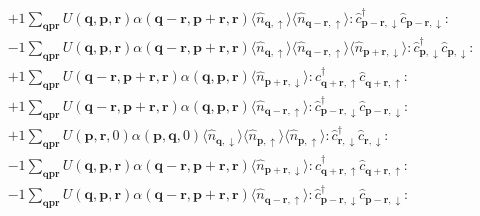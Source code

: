 \begin{align*}
	&+1 \sum_{ \mathbf{q} \mathbf{p} \mathbf{r} } U( \mathbf{q}, \mathbf{p}, \mathbf{r} )  \alpha( \mathbf{q}-\mathbf{r}, \mathbf{p}+\mathbf{r}, \mathbf{r} )   \langle \hat{n}_{ \mathbf{q}, \uparrow } \rangle \langle \hat{n}_{ \mathbf{q}-\mathbf{r}, \uparrow } \rangle :\hat{c}_{ \mathbf{p}-\mathbf{r}, \downarrow }^\dagger \hat{c}_{ \mathbf{p}-\mathbf{r}, \downarrow }^{\phantom{\dagger}}: \\
	&-1 \sum_{ \mathbf{q} \mathbf{p} \mathbf{r} } U( \mathbf{q}, \mathbf{p}, \mathbf{r} )  \alpha( \mathbf{q}-\mathbf{r}, \mathbf{p}+\mathbf{r}, \mathbf{r} )   \langle \hat{n}_{ \mathbf{q}, \uparrow } \rangle \langle \hat{n}_{ \mathbf{q}-\mathbf{r}, \uparrow } \rangle \langle \hat{n}_{ \mathbf{p}+\mathbf{r}, \downarrow } \rangle :\hat{c}_{ \mathbf{p}, \downarrow }^\dagger \hat{c}_{ \mathbf{p}, \downarrow }^{\phantom{\dagger}}: \\
	&+1 \sum_{ \mathbf{q} \mathbf{p} \mathbf{r} } U( \mathbf{q}-\mathbf{r}, \mathbf{p}+\mathbf{r}, \mathbf{r} )  \alpha( \mathbf{q}, \mathbf{p}, \mathbf{r} )   \langle \hat{n}_{ \mathbf{p}+\mathbf{r}, \downarrow } \rangle :\hat{c}_{ \mathbf{q}+\mathbf{r}, \uparrow }^\dagger \hat{c}_{ \mathbf{q}+\mathbf{r}, \uparrow }^{\phantom{\dagger}}: \\
	&+1 \sum_{ \mathbf{q} \mathbf{p} \mathbf{r} } U( \mathbf{q}-\mathbf{r}, \mathbf{p}+\mathbf{r}, \mathbf{r} )  \alpha( \mathbf{q}, \mathbf{p}, \mathbf{r} )   \langle \hat{n}_{ \mathbf{q}-\mathbf{r}, \uparrow } \rangle :\hat{c}_{ \mathbf{p}-\mathbf{r}, \downarrow }^\dagger \hat{c}_{ \mathbf{p}-\mathbf{r}, \downarrow }^{\phantom{\dagger}}: \\
	&+1 \sum_{ \mathbf{q} \mathbf{p} \mathbf{r} } U( \mathbf{p}, \mathbf{r}, 0 )  \alpha( \mathbf{p}, \mathbf{q}, 0 )   \langle \hat{n}_{ \mathbf{q}, \downarrow } \rangle \langle \hat{n}_{ \mathbf{p}, \uparrow } \rangle \langle \hat{n}_{ \mathbf{p}, \uparrow } \rangle :\hat{c}_{ \mathbf{r}, \downarrow }^\dagger \hat{c}_{ \mathbf{r}, \downarrow }^{\phantom{\dagger}}: \\
	&-1 \sum_{ \mathbf{q} \mathbf{p} \mathbf{r} } U( \mathbf{q}, \mathbf{p}, \mathbf{r} )  \alpha( \mathbf{q}-\mathbf{r}, \mathbf{p}+\mathbf{r}, \mathbf{r} )   \langle \hat{n}_{ \mathbf{p}+\mathbf{r}, \downarrow } \rangle :\hat{c}_{ \mathbf{q}+\mathbf{r}, \uparrow }^\dagger \hat{c}_{ \mathbf{q}+\mathbf{r}, \uparrow }^{\phantom{\dagger}}: \\
	&-1 \sum_{ \mathbf{q} \mathbf{p} \mathbf{r} } U( \mathbf{q}, \mathbf{p}, \mathbf{r} )  \alpha( \mathbf{q}-\mathbf{r}, \mathbf{p}+\mathbf{r}, \mathbf{r} )   \langle \hat{n}_{ \mathbf{q}-\mathbf{r}, \uparrow } \rangle :\hat{c}_{ \mathbf{p}-\mathbf{r}, \downarrow }^\dagger \hat{c}_{ \mathbf{p}-\mathbf{r}, \downarrow }^{\phantom{\dagger}}: \\

\end{align*}
